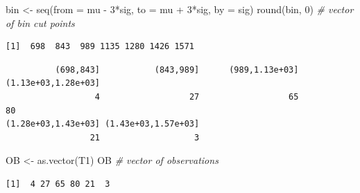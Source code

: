 \documentclass[
]{article}
\newenvironment{Shaded}{\begin{snugshade}}{\end{snugshade}}
\newcommand{\AttributeTok}[1]{\textcolor[rgb]{0.77,0.63,0.00}{#1}}
\newcommand{\CommentTok}[1]{\textcolor[rgb]{0.56,0.35,0.01}{\textit{#1}}}
\newcommand{\DecValTok}[1]{\textcolor[rgb]{0.00,0.00,0.81}{#1}}
\newcommand{\FunctionTok}[1]{\textcolor[rgb]{0.00,0.00,0.00}{#1}}
\newcommand{\NormalTok}[1]{#1}
\newcommand{\OtherTok}[1]{\textcolor[rgb]{0.56,0.35,0.01}{#1}}
\newcommand{\SpecialCharTok}[1]{\textcolor[rgb]{0.00,0.00,0.00}{#1}}
\begin{document}
\begin{Shaded}
\begin{Highlighting}[]
\NormalTok{bin }\OtherTok{\textless{}{-}} \FunctionTok{seq}\NormalTok{(}\AttributeTok{from =}\NormalTok{ mu }\SpecialCharTok{{-}} \DecValTok{3}\SpecialCharTok{*}\NormalTok{sig, }\AttributeTok{to =}\NormalTok{ mu }\SpecialCharTok{+} \DecValTok{3}\SpecialCharTok{*}\NormalTok{sig, }\AttributeTok{by =}\NormalTok{ sig)}
\FunctionTok{round}\NormalTok{(bin, }\DecValTok{0}\NormalTok{)                     }\CommentTok{\# vector of bin cut points}
\end{Highlighting}
\end{Shaded}

\begin{verbatim}
[1]  698  843  989 1135 1280 1426 1571
\end{verbatim}

\begin{Shaded}
\end{Shaded}

\begin{verbatim}
          (698,843]           (843,989]      (989,1.13e+03] (1.13e+03,1.28e+03] 
                  4                  27                  65                  80 
(1.28e+03,1.43e+03] (1.43e+03,1.57e+03] 
                 21                   3 
\end{verbatim}

\begin{Shaded}
\begin{Highlighting}[]
\NormalTok{OB }\OtherTok{\textless{}{-}} \FunctionTok{as.vector}\NormalTok{(T1)}
\NormalTok{OB                                }\CommentTok{\# vector of observations}
\end{Highlighting}
\end{Shaded}

\begin{verbatim}
[1]  4 27 65 80 21  3
\end{verbatim}
\end{document}
